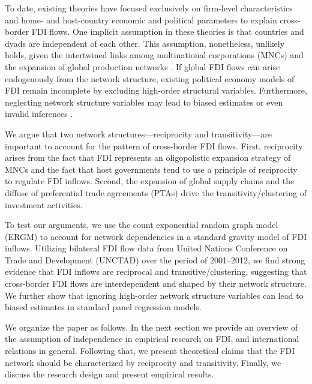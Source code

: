 \documentclass{article}
\begin{document}
To date, existing theories have focused exclusively on firm-level characteristics and home- and host-country economic and political parameters to explain cross-border FDI flows. One implicit assumption in these theories is that countries and dyads are independent of each other. This assumption, nonetheless, unlikely holds, given the intertwined links among multinational corporations (MNCs) and the expansion of global production networks \citep{UNCTAD:2013}. If global FDI flows can arise endogenously from the network structure, existing political economy models of FDI remain incomplete by excluding high-order structural variables. Furthermore, neglecting network structure variables may lead to biased estimates or even invalid inferences \citep{cranmer2011inferential}.

We argue that two network structures---reciprocity and transitivity---are important to account for the pattern of cross-border FDI flows. First, reciprocity arises from the fact that FDI represents an oligopolistic expansion strategy of MNCs and the fact that host governments tend to use a principle of reciprocity to regulate FDI inflows. Second, the expansion of global supply chains and the diffuse of preferential trade agreements (PTAs) drive the transitivity/clustering of investment activities.

To test our arguments, we use the count exponential random graph model (ERGM) to account for network dependencies in a standard gravity model of FDI inflows. Utilizing bilateral FDI flow data from United Nations Conference on Trade and Development (UNCTAD) over the period of 2001--2012, we find strong evidence that FDI inflows are reciprocal and transitive/clustering, suggesting that cross-border FDI flows are interdependent and shaped by their network structure. We further show that ignoring high-order network structure variables can lead to biased estimates in standard panel regression models.

We organize the paper as follows. In the next section we provide an overview of the assumption of independence in empirical research on FDI, and international relations in general. Following that, we present theoretical claims that the FDI network should be characterized by reciprocity and transitivity. Finally, we discuss the research design and present empirical results.
\end{document}
